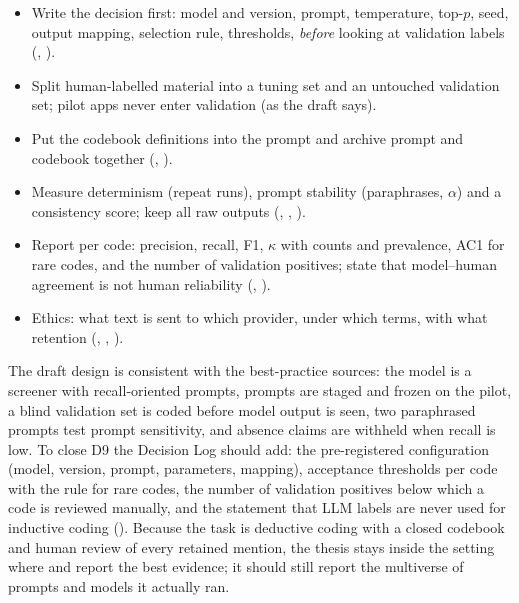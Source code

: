 \begin{protocolbox}
\begin{itemize}[leftmargin=1.3em]
\item Write the decision first: model and version, prompt, temperature, top-$p$, seed, output mapping, selection rule, thresholds, \emph{before} looking at validation labels (, ).
\item Split human-labelled material into a tuning set and an untouched validation set; pilot apps never enter validation (as the draft says).
\item Put the codebook definitions into the prompt and archive prompt and codebook together (, ).
\item Measure determinism (repeat runs), prompt stability (paraphrases, $\alpha$) and a consistency score; keep all raw outputs (, , ).
\item Report per code: precision, recall, F1, $\kappa$ with counts and prevalence, AC1 for rare codes, and the number of validation positives; state that model--human agreement is not human reliability (, ).
\item Ethics: what text is sent to which provider, under which terms, with what retention (, , ).
\end{itemize}
\end{protocolbox}

\begin{thesisbox}
The draft design is consistent with the best-practice sources: the model is a screener with recall-oriented prompts, prompts are staged and frozen on the pilot, a blind validation set is coded before model output is seen, two paraphrased prompts test prompt sensitivity, and absence claims are withheld when recall is low. To close D9 the Decision Log should add: the pre-registered configuration (model, version, prompt, parameters, mapping), acceptance thresholds per code with the rule for rare codes, the number of validation positives below which a code is reviewed manually, and the statement that LLM labels are never used for inductive coding (). Because the task is deductive coding with a closed codebook and human review of every retained mention, the thesis stays inside the setting where  and  report the best evidence; it should still report the multiverse of prompts and models it actually ran.
\end{thesisbox}
